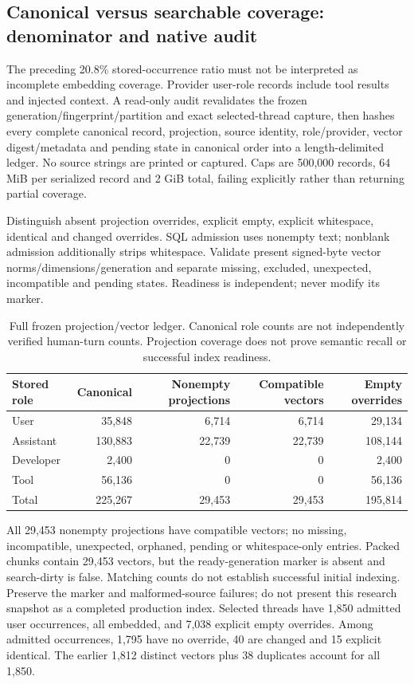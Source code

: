 \documentclass[11pt]{article}
\begin{document}
\subsection{Canonical versus searchable coverage: denominator and native audit}
The preceding 20.8\% stored-occurrence ratio must not be interpreted as incomplete
embedding coverage. Provider user-role records include tool results and injected
context. A read-only audit revalidates the frozen generation/fingerprint/partition
and exact selected-thread capture, then hashes every complete canonical record,
projection, source identity, role/provider, vector digest/metadata and pending
state in canonical order into a length-delimited ledger. No source strings are
printed or captured. Caps are 500,000 records, 64 MiB per serialized record and
2 GiB total, failing explicitly rather than returning partial coverage.

Distinguish absent projection overrides, explicit empty, explicit whitespace,
identical and changed overrides. SQL admission uses nonempty text; nonblank
admission additionally strips whitespace. Validate present signed-byte vector
norms/dimensions/generation and separate missing, excluded, unexpected,
incompatible and pending states. Readiness is independent; never modify its marker.

\begin{table}[ht]
\centering\small
\begin{tabular}{lrrrr}
\toprule
Stored role & Canonical & Nonempty projections & Compatible vectors & Empty overrides\\
\midrule
User & 35,848 & 6,714 & 6,714 & 29,134\\
Assistant & 130,883 & 22,739 & 22,739 & 108,144\\
Developer & 2,400 & 0 & 0 & 2,400\\
Tool & 56,136 & 0 & 0 & 56,136\\
Total & 225,267 & 29,453 & 29,453 & 195,814\\
\bottomrule
\end{tabular}
\caption{Full frozen projection/vector ledger. Canonical role counts are not
independently verified human-turn counts. Projection coverage does not prove
semantic recall or successful index readiness.}
\end{table}

All 29,453 nonempty projections have compatible vectors; no missing, incompatible,
unexpected, orphaned, pending or whitespace-only entries. Packed chunks contain
29,453 vectors, but the ready-generation marker is absent and search-dirty is
false. Matching counts do not establish successful initial indexing. Preserve
the marker and malformed-source failures; do not present this research snapshot
as a completed production index. Selected threads have 1,850 admitted user
occurrences, all embedded, and 7,038 explicit empty overrides. Among admitted
occurrences, 1,795 have no override, 40 are changed and 15 explicit identical.
The earlier 1,812 distinct vectors plus 38 duplicates account for all 1,850.
\end{document}
